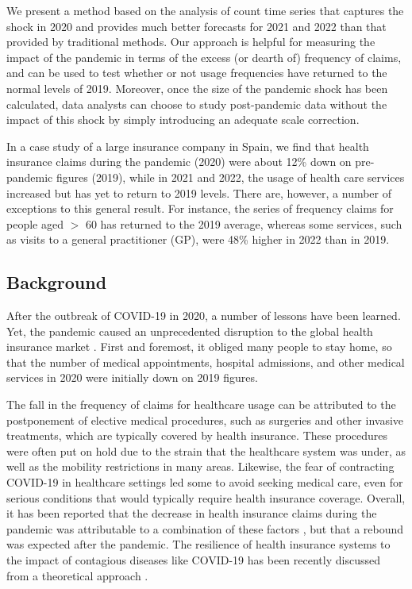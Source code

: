 \documentclass[]{risa}
\begin{document}
We present a method based on the analysis of count time series that captures the shock in 2020 and provides much better forecasts for 2021 and 2022 than that provided by traditional methods. Our approach is helpful for measuring the impact of the pandemic in terms of the excess (or dearth of) frequency of claims, and can be used to test whether or not usage frequencies have returned to the normal levels of 2019. Moreover, once the size of the pandemic shock has been calculated, data analysts can choose to study post-pandemic data without the impact of this shock by simply introducing an adequate scale correction.

In a case study of a large insurance company in Spain, we find that health insurance claims during the pandemic (2020) were about 12\% down on pre-pandemic figures (2019), while in 2021 and 2022, the usage of health care services increased but has yet to return to 2019 levels. There are, however, a number of exceptions to this general result. For instance, the series of frequency claims for people aged $>$ 60 has returned to the 2019 average, whereas some services, such as visits to a general practitioner (GP), were 48\% higher in 2022 than in 2019.

\subsection{Background}
After the outbreak of COVID-19 in 2020, a number of lessons have been learned. Yet, the pandemic caused an unprecedented disruption to the global health insurance market \cite{przybytniowski2022risk, szczygielski2022impact}. First and foremost, it obliged many people to stay home, so that the number of medical appointments, hospital admissions, and other medical services in 2020 were initially down on 2019 figures. 

The fall in the frequency of claims for healthcare usage can be attributed to the postponement of elective medical procedures, such as surgeries and other invasive treatments, which are typically covered by health insurance. These procedures were often put on hold due to the strain that the healthcare system was under, as well as the mobility restrictions in many areas. Likewise, the fear of contracting COVID-19 in healthcare settings led some to avoid seeking medical care, even for serious conditions that would typically require health insurance coverage. Overall, it has been reported that the decrease in health insurance claims during the pandemic was attributable to a combination of these factors \cite{plott2020unexpected}, but that a rebound was expected after the pandemic. The resilience of health insurance systems to the impact of contagious diseases like COVID-19 has been recently discussed from a theoretical approach \cite{}.
\end{document}
